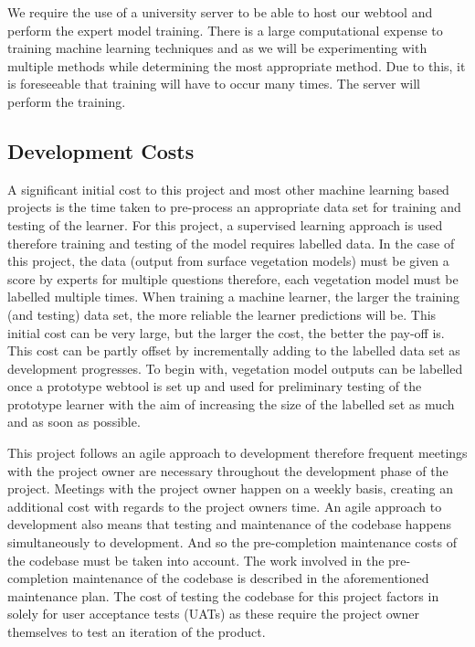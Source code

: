 \documentclass{ecmm427_assignment}
\begin{document}
We require the use of a university server to be able to host our webtool and perform the expert model training. There is a large computational expense to training machine learning techniques and as we will be experimenting with multiple methods while determining the most appropriate method. Due to this, it is foreseeable that training will have to occur many times. The server will perform the training.


\subsection{Development Costs}
 A significant initial cost to this project and most other machine learning based projects is the time taken to pre-process an appropriate data set for training and testing of the learner. For this project, a supervised learning approach is used therefore training and testing of the model requires labelled data. In the case of this project, the data (output from surface vegetation models) must be given a score by experts for multiple questions therefore, each vegetation model must be labelled multiple times. When training a machine learner, the larger the training (and testing) data set, the more reliable the learner predictions will be. This initial cost can be very large, but the larger the cost, the better the pay-off is. This cost can be partly offset by incrementally adding to the labelled data set as development progresses. To begin with, vegetation model outputs can be labelled once a prototype webtool is set up and used for preliminary testing of the prototype learner with the aim of increasing the size of the labelled set as much and as soon as possible.

 This project follows an agile approach to development therefore frequent meetings with the project owner are necessary throughout the development phase of the project. Meetings with the project owner happen on a weekly basis, creating an additional cost with regards to the project owners time. An agile approach to development also means that testing and maintenance of the codebase happens simultaneously to development. And so the pre-completion maintenance costs of the codebase must be taken into account. The work involved in the pre-completion maintenance of the codebase is described in the aforementioned maintenance plan. The cost of testing the codebase for this project factors in solely for user acceptance tests (UATs) as these require the project owner themselves to test an iteration of the product.
\end{document}
